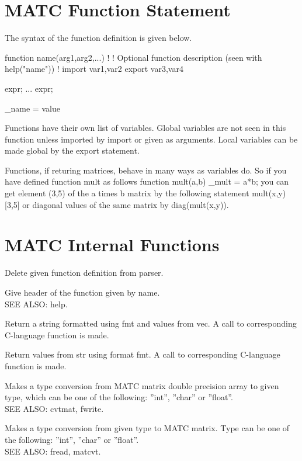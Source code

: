 \section{MATC Function Statement}


The syntax of the function definition is given below. 

\ttbegin
function name(arg1,arg2,...)
!
! Optional function description (seen with help("name"))
!
import var1,var2
export var3,var4
{
    expr;
     ...
    expr;

    \_name = value
}
\ttend

Functions have their own list of variables. Global variables are not seen in this 
function unless imported by import or given as arguments. Local variables can be made global by the export statement. 

Functions, if returing matrices, behave in many ways as variables do. So if you have defined function mult as follows 
\ttbegin
function mult(a,b)
{
   _mult = a*b;
}
\ttend
you can get element (3,5) of the a times b matrix by the following statement 
\ttbegin
mult(x,y)[3,5]
\ttend
or diagonal values of the same matrix by 
\ttbegin
diag(mult(x,y)).
\ttend


\section{MATC Internal Functions}

\sifbegin
{}
Delete given function definition from parser. 

Give header of the function given by name. \\
SEE ALSO: help. 

Return a string formatted using fmt and values from vec. A call to corresponding C-language function is made. 

Return values from str using format fmt. A call to corresponding C-language function is made. 

Makes a type conversion from MATC matrix double precision array to given type, 
which can be one of the following: ''int'', ''char'' or ''float''. \\
SEE ALSO: cvtmat, fwrite. 

Makes a type conversion from given type to MATC matrix. Type can be one of the following: ''int'', ''char'' or ''float''. \\
SEE ALSO: fread, matcvt. 

